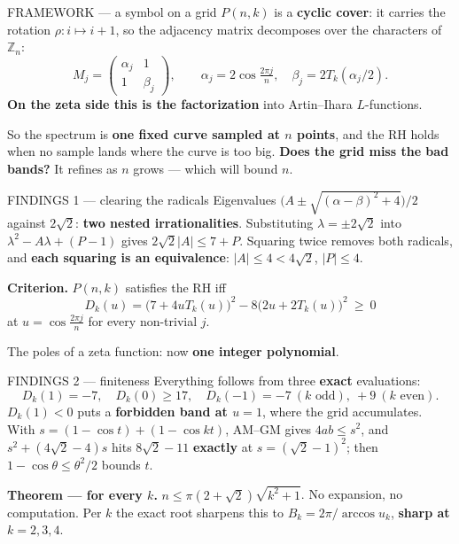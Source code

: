 \documentclass[aspectratio=169,14pt]{beamer}
\newcommand{\key}[1]{\textcolor{myblue}{\textbf{#1}}}
\newcommand{\kb}[1]{\begin{center}\colorbox{mylight}{\parbox{0.94\textwidth}{#1}}\end{center}}
\begin{document}
\begin{frame}{FRAMEWORK --- a symbol on a grid}
$P(n,k)$ is a \key{cyclic cover}: it carries the rotation $\rho:i\mapsto i+1$,
so the adjacency matrix decomposes over the characters of $\mathbb Z_n$:
\[
  M_j=\begin{pmatrix}\alpha_j&1\\1&\beta_j\end{pmatrix},\qquad
  \alpha_j=2\cos\tfrac{2\pi j}{n},\quad\beta_j=2T_k(\alpha_j/2).
\]
\key{On the zeta side this is the factorization} into Artin--Ihara
$L$-functions.

\kb{So the spectrum is \key{one fixed curve sampled at $n$ points}, and the RH
holds when no sample lands where the curve is too big. \key{Does the grid miss
the bad bands?} It refines as $n$ grows --- which will bound $n$.}
\end{frame}

\begin{frame}{FINDINGS 1 --- clearing the radicals}
Eigenvalues $\bigl(A\pm\sqrt{(\alpha-\beta)^2+4}\bigr)/2$ against $2\sqrt2$:
\key{two nested irrationalities}. Substituting $\lambda=\pm2\sqrt2$ into $\lambda^2-A\lambda+(P-1)$ gives
$2\sqrt2|A|\le7+P$. Squaring twice removes both radicals, and \key{each squaring
is an equivalence}: $|A|\le4<4\sqrt2$, $|P|\le4$.

\kb{\key{Criterion.} $P(n,k)$ satisfies the RH iff
\[D_k(u)=\bigl(7+4uT_k(u)\bigr)^2-8\bigl(2u+2T_k(u)\bigr)^2\ \ge\ 0\]
at $u=\cos\frac{2\pi j}{n}$ for every non-trivial $j$.}

The poles of a zeta function: now \key{one integer polynomial}.
\end{frame}

\begin{frame}{FINDINGS 2 --- finiteness}
Everything follows from three \key{exact} evaluations:
\[
  D_k(1)=-7,\quad D_k(0)\ge17,\quad
  D_k(-1)=-7\ (k\text{ odd}),\ +9\ (k\text{ even}).
\]
$D_k(1)<0$ puts a \key{forbidden band at $u=1$}, where the grid accumulates.
With $s=(1-\cos t)+(1-\cos kt)$, AM--GM gives $4ab\le s^2$, and
$s^2+(4\sqrt2-4)s$ hits $8\sqrt2-11$ \key{exactly} at $s=(\sqrt2-1)^2$; then
$1-\cos\theta\le\theta^2/2$ bounds $t$.

\kb{\key{Theorem --- for every $k$.} $n\le\pi(2+\sqrt2)\sqrt{k^2+1}$. No
expansion, no computation. Per $k$ the exact root sharpens this to
$B_k=2\pi/\arccos u_k$, \key{sharp at $k=2,3,4$}.}
\end{frame}
\end{document}
